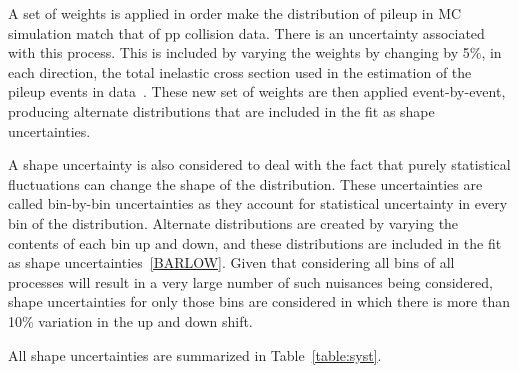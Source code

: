 A set of weights is applied in order make the distribution of pileup in MC simulation match that of pp collision data. There is an uncertainty associated with this process. This is included  by varying the weights by changing by 5\%, in each direction, the total inelastic cross section used in the estimation of the pileup events in data~\cite{Sirunyan:2018nqx}. These new set of weights are then applied event-by-event, producing alternate distributions that are included in the fit as shape uncertainties.

A shape uncertainty is also considered to deal with the fact that purely statistical fluctuations can change the shape of the distribution. These uncertainties are called bin-by-bin uncertainties as they account for statistical uncertainty in every bin of the distribution. Alternate distributions are created by varying the contents of each bin up and down, and these distributions are included in the fit as shape uncertainties~\ref{BARLOW}. Given that considering all bins of all processes will result in a very large number of such nuisances being considered, shape uncertainties for only those bins are considered in which there is more than 10\% variation in the up and down shift.   

All shape uncertainties are summarized in Table~\ref{table:syst}.


%
% 
% 


